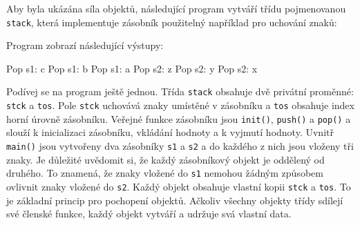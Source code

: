       \begin{example}\label{stack1}
        Aby byla ukázána síla objektů, následující program vytváří třídu pojmenovanou 
        \lstinline[basicstyle=\ttfamily]!stack!, která implementuje zásobník použitelný například 
        pro uchování znaků:
        
        Program zobrazí následující výstupy:
        \begin{center}
        Pop s1: c\linebreak
        Pop s1: b\linebreak
        Pop s1: a\linebreak
        Pop s2: z\linebreak
        Pop s2: y\linebreak
        Pop s2: x
        \end{center}
  
        Podívej se na program ještě jednou. Třída \lstinline[basicstyle=\ttfamily]!stack! obsahuje 
        dvě privátní proměnné: \lstinline[basicstyle=\ttfamily]!stck! a 
        \lstinline[basicstyle=\ttfamily]!tos!. Pole 
        \lstinline[basicstyle=\ttfamily]!stck! uchovává znaky umístěné v zásobníku a 
        \lstinline[basicstyle=\ttfamily]!tos! obsahuje index horní úrovně zásobníku. Veřejné funkce 
        zásobníku jsou \lstinline[basicstyle=\ttfamily]!init()!, 
        \lstinline[basicstyle=\ttfamily]!push()! a
        \lstinline[basicstyle=\ttfamily]!pop()! a slouží k inicializaci zásobníku, vkládání hodnoty 
        a k vyjmutí hodnoty. Uvnitř \lstinline[basicstyle=\ttfamily]!main()! jsou vytvořeny dva 
        zásobníky \lstinline[basicstyle=\ttfamily]!s1! a \lstinline[basicstyle=\ttfamily]!s2! a do 
        každého z nich jsou vloženy tři znaky. Je důležité uvědomit si, že každý zásobníkový objekt 
        je oddělený od druhého. To znamená, že znaky vložené do         
        \lstinline[basicstyle=\ttfamily]!s1! nemohou žádným způsobem ovlivnit znaky vložené do 
        \lstinline[basicstyle=\ttfamily]!s2!. Každý objekt obsahuje vlastní kopii 
        \lstinline[basicstyle=\ttfamily]!stck! a \lstinline[basicstyle=\ttfamily]!tos!. To je 
        základní princip pro pochopení objektů. Ačkoliv všechny objekty třídy sdílejí své členské 
        funkce, každý objekt vytváří a udržuje svá vlastní 
        data.
      \end{example}	
  
